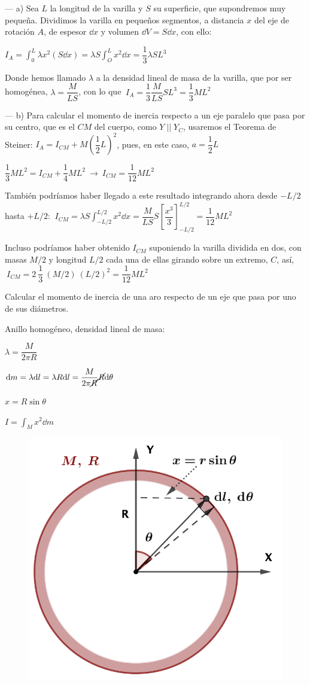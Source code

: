 --- a) Sea $L$ la longitud de la varilla y $S$ su superficie, que supondremos muy pequeña. Dividimos la varilla en pequeños segmentos, a distancia $x$ del eje de rotación $A$, de espesor $\dd x$ y volumen $\dd V=S\dd x$, con ello:

$\displaystyle I_A=\displaystyle \int_0^L \lambda x^2 (S\dd x)=\lambda S \int_O^L x^2 \dd x= \dfrac 1 3 \lambda S L^3$

Donde hemos llamado $\lambda$ a la densidad lineal de masa de la varilla, que por ser homogénea, $\lambda=\dfrac M{LS}$, con lo que
$\ I_A=\dfrac 1 3 \dfrac{M}{LS} SL^3=\dfrac 1 3 M L^2$

--- b) Para calcular el momento de inercia respecto a un eje paralelo que pasa por su centro, que es el $CM$ del cuerpo, como $Y\; || \; Y_C$, usaremos el Teorema de Steiner:
$I_A=I_{CM}+M\left( \dfrac 1 2 L \right)^2$, pues, en este caso, $a=\dfrac 1 2 L$ 

$\dfrac 1 3 M L^2=I_{CM}+\dfrac 1 4 M L^2 \ \to \ I_{CM}=\dfrac{1}{12}ML^2$

\textcolor{gris}{También podríamos haber llegado a este resultado integrando ahora desde $-L/2$ hasta $+L/2$: $\ \displaystyle I_{CM}=\lambda S \int_{-L/2}^{L/2}x^2 \dd x=\dfrac {M}{LS} S \left[ \dfrac {x^3}{3} \right]_{-L/2}^{L/2} = \dfrac {1}{12} ML^2$}

\textcolor{gris}{Incluso podríamos haber obtenido $I_{CM}$ suponiendo la varilla dividida en dos, con masas $M/2$ y longitud $L/2$ cada una de ellas girando sobre un extremo, $C$, así,
$\ I_{CM}=2\ \dfrac 1 3 \ (M/2)\ (L/2)^2 = \dfrac 1 {12} ML^2$}


\vspace{10mm} %
\begin{prob}
Calcular el momento de inercia de una aro respecto de un eje que pasa por uno de sus diámetros.	
\end{prob}

\begin{multicols}{2}
Anillo homogéneo, densidad lineal de masa:

$\lambda=\dfrac {M}{2\pi R}$

$ \dd m=\lambda \dd l=\lambda R\dd l =\dfrac {M}{2\pi \cancel{R}}\cancel{R}\dd \theta$

$x=R\sin \theta$

$I=\displaystyle \int_M x^2 \dd m$
\begin{figure}[H]
	\centering
	\includegraphics[width=.25\textwidth]{imagenes/imagenes16/T16IM15.png}
\end{figure}	
\end{multicols}

